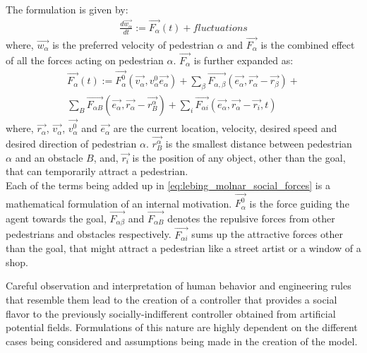 The formulation is given by:
\\
\begin{align}
\label{eq:helbing_final_eq}
\frac{d\vec{w_{\alpha}}}{dt}:=\vec{F_{\alpha}}(t)+fluctuations
\end{align}
where, $\vec{w_{\alpha}}$ is the preferred velocity of pedestrian $\alpha$ and $\vec{F_{\alpha}}$ is the combined effect of all the forces acting on pedestrian $\alpha$. $\vec{F_{\alpha}}$ is further expanded as:\\
\begin{multline}
\label{eq:lebing_molnar_social_forces}
\vec{F_{\alpha}}(t):=
\vec{F_{\alpha}^{0}}(\vec{v_{\alpha}}, v_{\alpha}^{0}\vec{e_{\alpha}})+\sum_{\beta}\vec{F_{\alpha, \beta}}(\vec{e_{\alpha}}, \vec{r_{\alpha}} - \vec{r_{\beta}})
+\\\sum_{B}\vec{F_{\alpha B}}(\vec{e_{\alpha}}, \vec{r_{\alpha}} - \vec{r_{B}^{\alpha}}) + \sum_{i}\vec{F_{\alpha i}}(\vec{e_{\alpha}}, \vec{r_{\alpha}}-\vec{r_i},t)
\end{multline}
where, $\vec{r_{\alpha}}$,  $\vec{v_{\alpha}}$,  $\vec{v^{0}_{\alpha}}$ and $\vec{e_{\alpha}}$  are the current location, velocity, desired speed and desired direction of pedestrian $\alpha$. $\vec{r^{\alpha}_{B}}$ is the smallest distance between pedestrian $\alpha$ and an obstacle $B$, and, $\vec{r_i}$ is the position of any object, other than the goal, that can temporarily attract a pedestrian. \\
Each of the terms being added up in \autoref{eq:lebing_molnar_social_forces} is a mathematical formulation of an internal motivation.
$\vec{F_{\alpha}^{0}}$ is the force guiding the agent towards the goal, $\vec{F_{\alpha\beta}}$ and  $\vec{F_{\alpha B}}$ denotes the repulsive forces from other pedestrians and obstacles respectively.
$\vec{F_{\alpha i}}$  sums up the attractive forces other than the goal, that might attract a pedestrian like a street artist or a window of a shop.
\par
Careful observation and interpretation of human behavior and engineering rules that resemble them lead to the creation of a controller that provides a social flavor to the previously socially-indifferent controller obtained from artificial potential fields. Formulations of this nature are highly dependent on the different cases being considered and assumptions being made in the creation of the model.


